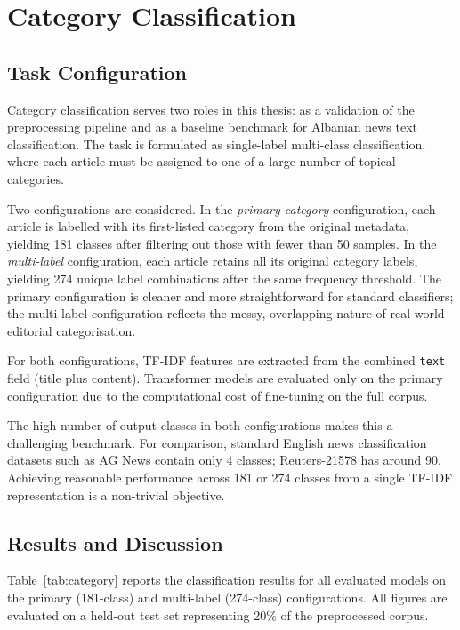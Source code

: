 \documentclass[12pt,a4paper]{article}
\begin{document}
\newpage
\section{Category Classification}
\label{sec:category}

\subsection{Task Configuration}
\label{subsec:category_config}

Category classification serves two roles in this thesis: as a validation of the preprocessing pipeline and as a baseline benchmark for Albanian news text classification. The task is formulated as single-label multi-class classification, where each article must be assigned to one of a large number of topical categories.

Two configurations are considered. In the \textit{primary category} configuration, each article is labelled with its first-listed category from the original metadata, yielding 181 classes after filtering out those with fewer than 50 samples. In the \textit{multi-label} configuration, each article retains all its original category labels, yielding 274 unique label combinations after the same frequency threshold. The primary configuration is cleaner and more straightforward for standard classifiers; the multi-label configuration reflects the messy, overlapping nature of real-world editorial categorisation.

For both configurations, TF-IDF features are extracted from the combined \texttt{text} field (title plus content). Transformer models are evaluated only on the primary configuration due to the computational cost of fine-tuning on the full corpus.

The high number of output classes in both configurations makes this a challenging benchmark. For comparison, standard English news classification datasets such as AG News contain only 4 classes; Reuters-21578 has around 90. Achieving reasonable performance across 181 or 274 classes from a single TF-IDF representation is a non-trivial objective.

\subsection{Results and Discussion}
\label{subsec:category_results}

Table~\ref{tab:category} reports the classification results for all evaluated models on the primary (181-class) and multi-label (274-class) configurations. All figures are evaluated on a held-out test set representing 20\% of the preprocessed corpus.
\end{document}
